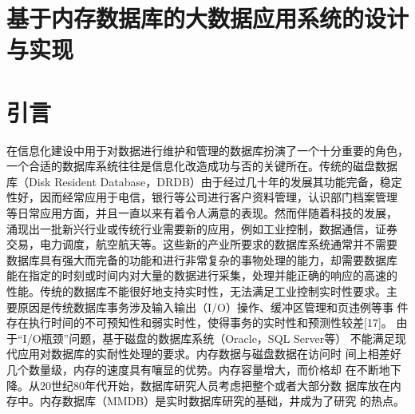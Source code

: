 \documentclass[literaturereview]{zjutreport}
\begin{document}



\frontmatter

\begingroup %
\let\clearpage\relax %

\titleformat{\chapter}[block]{\sihao\heiti\filcenter\bfseries}{\CJKnumber{\thechapter}}{1ex}{}{} %
\chapter*{基于内存数据库的大数据应用系统的设计与实现}
{} %


\mainmatter
\chapter{引言}
在信息化建设中用于对数据进行维护和管理的数据库扮演了一个十分重要的角色，
一个合适的数据库系统往往是信息化改造成功与否的关键所在。传统的磁盘数据
库（Disk Resident Database，DRDB）由于经过几十年的发展其功能完备，稳定
性好，因而经常应用于电信，银行等公司进行客户资料管理，认识部门档案管理
等日常应用方面，并且一直以来有着令人满意的表现。然而伴随着科技的发展，
涌现出一批新兴行业或传统行业需要新的应用，例如工业控制，数据通信，证券
交易，电力调度，航空航天等。这些新的产业所要求的数据库系统通常并不需要
数据库具有强大而完备的功能和进行非常复杂的事物处理的能力，却需要数据库
能在指定的时刻或时间内对大量的数据进行采集，处理并能正确的响应的高速的
性能。传统的数据库不能很好地支持实时性，无法满足工业控制实时性要求。主
要原因是传统数据库事务涉及输入输出（I/O）操作、缓冲区管理和页违例等事
件存在执行时间的不可预知性和弱实时性，使得事务的实时性和预测性较差[17]。
由于“I/O瓶颈”问题，基于磁盘的数据库系统（Oracle，SQL Server等）
不能满足现代应用对数据库的实耐性处理的要求。内存数据与磁盘数据在访问时
间上相差好几个数量级，内存的速度具有嚷显的优势。内存容量增大，而价格却
在不断地下降。从20世纪80年代开始，数据库研究人员考虑把整个或者大部分数
据库放在内存中。内存数据库（MMDB）是实时数据库研究的基础，井成为了研究
的热点。
\end{document}
